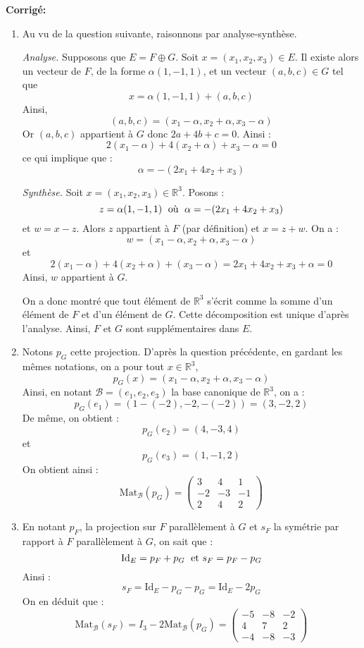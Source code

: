 \documentclass[a4paper,twoside,french,11pt]{VcCours}
\newcommand{\corr}{\textbf{Corrigé:}}
\begin{document}
\corr 

\begin{enumerate}
\item Au vu de la question suivante, raisonnons par analyse-synthèse.



\noindent \textit{Analyse.} Supposons que $E = F \oplus G$. Soit $x=(x_1,x_2,x_3) \in E$. Il existe alors un vecteur de $F$, de la forme $\alpha (1,-1,1)$, et un vecteur $(a,b,c) \in G$ tel que 
$$x = \alpha (1,-1,1) + (a,b,c)$$
Ainsi,
$$ (a,b,c) = (x_1 - \alpha, x_2+\alpha, x_3- \alpha)$$
Or $(a,b,c)$ appartient à $G$ donc $2a+4b+c=0$. Ainsi :
$$ 2(x_1 -\alpha) + 4 (x_2+ \alpha) + x_3- \alpha = 0$$
ce qui implique que :
$$ \alpha = - (2x_1+4x_2+x_3)$$



\noindent \textit{Synthèse.} Soit $x=(x_1,x_2,x_3) \in \mathbb{R}^3$. Posons :
$$ z = \alpha (1,-1,1) \; \hbox{ où } \; \alpha = - (2x_1+4x_2+x_3)$$
et $w=x-z$. Alors $z$ appartient à $F$ (par définition) et $x=z+w$. On a :
$$ w = (x_1- \alpha, x_2+ \alpha, x_3- \alpha)$$
et 
$$ 2(x_1 - \alpha) + 4(x_2+ \alpha) + (x_3-\alpha) = 2x_1+4x_2+x_3 + \alpha = 0$$
Ainsi, $w$ appartient à $G$.



\noindent On a donc montré que tout élément de $\mathbb{R}^3$ s'écrit comme la somme d'un élément de $F$ et d'un élément de $G$. Cette décomposition est unique d'après l'analyse. Ainsi, $F$ et $G$ sont supplémentaires dans $E$.
\item Notons $p_G$ cette projection. D'après la question précédente, en gardant les mêmes notations, on a pour tout $x \in \mathbb{R}^3$,
$$ p_G(x) = (x_1- \alpha, x_2+ \alpha, x_3- \alpha)$$
Ainsi, en notant $\mathcal{B}=(e_1,e_2,e_3)$ la base canonique de $\mathbb{R}^3$, on a :
$$ p_G(e_1) =(1 - (-2), -2, -(-2)) = (3,-2,2) $$
De même, on obtient :
$$ p_G(e_2) = (4,-3, 4) $$
et 
$$ p_G(e_3) = (1, -1, 2) $$
On obtient ainsi :
$$ \textrm{Mat}_{\mathcal{B}}(p_G) =  \begin{pmatrix}
3 & 4& 1 \\
-2& -3 & -1 \\
2 & 4 & 2
\end{pmatrix}$$
\item En notant $p_F$, la projection sur $F$ parallèlement à $G$ et $s_F$ la symétrie par rapport à $F$ parallèlement à $G$, on sait que :
$$ \textrm{Id}_E = p_F+p_G \; \hbox{ et } s_F = p_F-p_G$$
Ainsi :
$$ s_F = \textrm{Id}_E- p_G-p_G = \textrm{Id}_E - 2p_G$$
On en déduit que :
$$ \textrm{Mat}_{\mathcal{B}}(s_F) = I_3 - 2 \textrm{Mat}_{\mathcal{B}}(p_G) =  \begin{pmatrix}
-5 & -8& -2 \\
4& 7 & 2 \\
-4 & -8 & -3
\end{pmatrix}$$
\end{enumerate}
\end{document}
